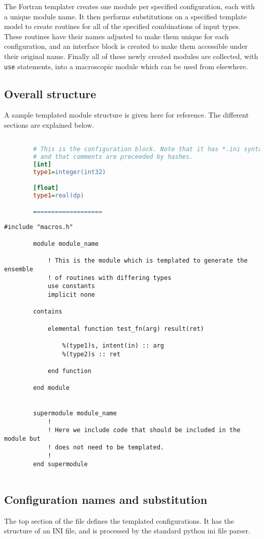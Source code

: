 \documentclass[a4paper,notitlepage]{scrreprt}
\let\code\lstinline
\begin{document}
	The Fortran templater creates one module per specified configuration,
	each with a unique module name. It then performs substitutions on a
	specified template model to create routines for all of the specified
	combinations of input types. These routines have their names adjusted to
	make them unique for each configuration, and an interface block is created
	to make them accessible under their original name. Finally all of these
	newly created modules are collected, with \code{use} statements, into
	a macroscopic module which can be used from elsewhere.

\subsection{Overall structure}
	A sample templated module structure is given here for reference. The
	different sections are explained below.

	\begin{lstlisting}[gobble=4,language=ini]

		# This is the configuration block. Note that it has *.ini syntax,
		# and that comments are preceeded by hashes.
		[int]
		type1=integer(int32)

		[float]
		type1=real(dp)

		===================
	\end{lstlisting}
	\begin{lstlisting}[gobble=4]
		#include "macros.h"

		module module_name

			! This is the module which is templated to generate the ensemble
			! of routines with differing types
			use constants
			implicit none

		contains

			elemental function test_fn(arg) result(ret)

				%(type1)s, intent(in) :: arg
				%(type2)s :: ret

			end function

		end module


		supermodule module_name
			!
			! Here we include code that should be included in the module but
			! does not need to be templated.
			!
		end supermodule


	\end{lstlisting}

\subsection{Configuration names and substitution}
	The top section of the file defines the templated configurations. It has
	the structure of an INI file, and is processed by the standard python ini
	file parser.
\end{document}

